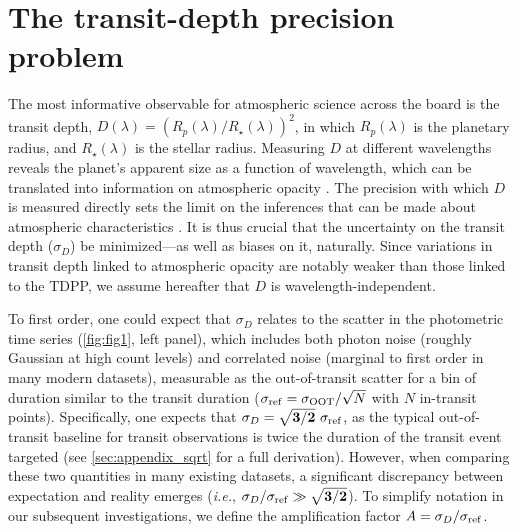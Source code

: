 \documentclass[twocolumn]{aastex631}
\begin{document}
\section{The transit-depth precision problem}\label{sec:TDPP}

The most informative observable for atmospheric science across the board is the transit depth, $D(\lambda) = (R_p(\lambda)/R_{\star}(\lambda))^2$, in which $R_p(\lambda)$ is the planetary radius, and $R_\star(\lambda)$ is the stellar radius. Measuring $D$ at different wavelengths reveals the planet's apparent size as a function of wavelength, which can be translated into information on atmospheric opacity \citep[e.g.,][]{Seager2000, Benneke2012, deWit2013}. The precision with which $D$ is measured directly sets the limit on the inferences that can be made about atmospheric characteristics \citep[e.g.,][]{Deming2009, Greene2016}. It is thus crucial that the uncertainty on the transit depth ($\sigma_D$) be minimized---as well as biases on it, naturally. Since variations in transit depth linked to atmospheric opacity are notably weaker than those linked to the TDPP, we assume hereafter that $D$ is wavelength-independent.

To first order, one could expect that $\sigma_D$ relates to the scatter in the photometric time series (\autoref{fig:fig1}, left panel), which includes both photon noise (roughly Gaussian at high count levels) and correlated noise (marginal to first order in many modern datasets), measurable as the out-of-transit scatter for a bin of duration similar to the transit duration ($\sigma_{\rm ref} = \sigma_{\rm OOT}/\sqrt{N}$ with $N$ in-transit points). Specifically, one expects that $\sigma_D = \mathbf{\sqrt{3/2}} \ \sigma_{\rm ref}$, as the typical out-of-transit baseline for transit observations is twice the duration of the transit event targeted (see \autoref{sec:appendix_sqrt} for a full derivation). However, when comparing these two quantities in many existing datasets, a significant discrepancy between expectation and reality emerges (\textit{i.e.}, $\sigma_D/\sigma_{\rm ref}\gg \mathbf{\sqrt{3/2}}$). 
To simplify notation in our subsequent investigations, we define the amplification factor $A = {\sigma_D}/\sigma_{\rm ref}$.
\end{document}
